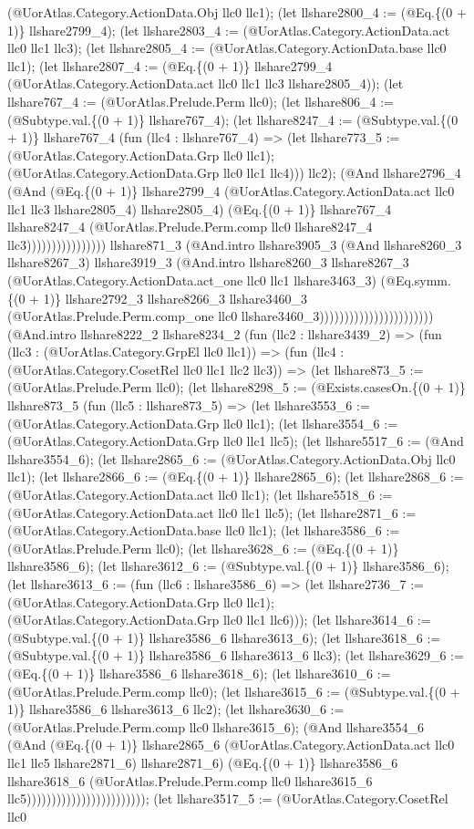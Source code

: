 \documentclass[11pt]{article}
\begin{document}
(@UorAtlas.Category.ActionData.Obj llc0 llc1); (let llshare2800\_4 := (@Eq.\{(0 + 1)\} llshare2799\_4); (let llshare2803\_4 := (@UorAtlas.Category.ActionData.act llc0 llc1 llc3); (let llshare2805\_4 := (@UorAtlas.Category.ActionData.base llc0 llc1); (let llshare2807\_4 := (@Eq.\{(0 + 1)\} llshare2799\_4 (@UorAtlas.Category.ActionData.act llc0 llc1 llc3 llshare2805\_4)); (let llshare767\_4 := (@UorAtlas.Prelude.Perm llc0); (let llshare806\_4 := (@Subtype.val.\{(0 + 1)\} llshare767\_4); (let llshare8247\_4 := (@Subtype.val.\{(0 + 1)\} llshare767\_4 (fun (llc4 : llshare767\_4) => (let llshare773\_5 := (@UorAtlas.Category.ActionData.Grp llc0 llc1); (@UorAtlas.Category.ActionData.Grp llc0 llc1 llc4))) llc2); (@And llshare2796\_4 (@And (@Eq.\{(0 + 1)\} llshare2799\_4 (@UorAtlas.Category.ActionData.act llc0 llc1 llc3 llshare2805\_4) llshare2805\_4) (@Eq.\{(0 + 1)\} llshare767\_4 llshare8247\_4 (@UorAtlas.Prelude.Perm.comp llc0 llshare8247\_4 llc3)))))))))))))))) llshare871\_3 (@And.intro llshare3905\_3 (@And llshare8260\_3 llshare8267\_3) llshare3919\_3 (@And.intro llshare8260\_3 llshare8267\_3 (@UorAtlas.Category.ActionData.act\_one llc0 llc1 llshare3463\_3) (@Eq.symm.\{(0 + 1)\} llshare2792\_3 llshare8266\_3 llshare3460\_3 (@UorAtlas.Prelude.Perm.comp\_one llc0 llshare3460\_3))))))))))))))))))))))) (@And.intro llshare8222\_2 llshare8234\_2 (fun (llc2 : llshare3439\_2) => (fun (llc3 : (@UorAtlas.Category.GrpEl llc0 llc1)) => (fun (llc4 : (@UorAtlas.Category.CosetRel llc0 llc1 llc2 llc3)) => (let llshare873\_5 := (@UorAtlas.Prelude.Perm llc0); (let llshare8298\_5 := (@Exists.casesOn.\{(0 + 1)\} llshare873\_5 (fun (llc5 : llshare873\_5) => (let llshare3553\_6 := (@UorAtlas.Category.ActionData.Grp llc0 llc1); (let llshare3554\_6 := (@UorAtlas.Category.ActionData.Grp llc0 llc1 llc5); (let llshare5517\_6 := (@And llshare3554\_6); (let llshare2865\_6 := (@UorAtlas.Category.ActionData.Obj llc0 llc1); (let llshare2866\_6 := (@Eq.\{(0 + 1)\} llshare2865\_6); (let llshare2868\_6 := (@UorAtlas.Category.ActionData.act llc0 llc1); (let llshare5518\_6 := (@UorAtlas.Category.ActionData.act llc0 llc1 llc5); (let llshare2871\_6 := (@UorAtlas.Category.ActionData.base llc0 llc1); (let llshare3586\_6 := (@UorAtlas.Prelude.Perm llc0); (let llshare3628\_6 := (@Eq.\{(0 + 1)\} llshare3586\_6); (let llshare3612\_6 := (@Subtype.val.\{(0 + 1)\} llshare3586\_6); (let llshare3613\_6 := (fun (llc6 : llshare3586\_6) => (let llshare2736\_7 := (@UorAtlas.Category.ActionData.Grp llc0 llc1); (@UorAtlas.Category.ActionData.Grp llc0 llc1 llc6))); (let llshare3614\_6 := (@Subtype.val.\{(0 + 1)\} llshare3586\_6 llshare3613\_6); (let llshare3618\_6 := (@Subtype.val.\{(0 + 1)\} llshare3586\_6 llshare3613\_6 llc3); (let llshare3629\_6 := (@Eq.\{(0 + 1)\} llshare3586\_6 llshare3618\_6); (let llshare3610\_6 := (@UorAtlas.Prelude.Perm.comp llc0); (let llshare3615\_6 := (@Subtype.val.\{(0 + 1)\} llshare3586\_6 llshare3613\_6 llc2); (let llshare3630\_6 := (@UorAtlas.Prelude.Perm.comp llc0 llshare3615\_6); (@And llshare3554\_6 (@And (@Eq.\{(0 + 1)\} llshare2865\_6 (@UorAtlas.Category.ActionData.act llc0 llc1 llc5 llshare2871\_6) llshare2871\_6) (@Eq.\{(0 + 1)\} llshare3586\_6 llshare3618\_6 (@UorAtlas.Prelude.Perm.comp llc0 llshare3615\_6 llc5)))))))))))))))))))))))); (let llshare3517\_5 := (@UorAtlas.Category.CosetRel llc0 
\end{document}
